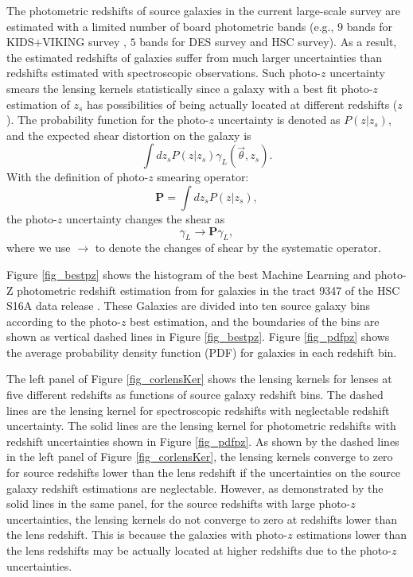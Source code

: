 \documentclass[twocolumn]{aastex62}
\begin{document}
The photometric redshifts of source galaxies in the current large-scale survey
are estimated with a limited number of board photometric bands (e.g., $9$ bands
for KIDS$+$VIKING survey \citep{KIDS_VIKING-Hildebrant2020}, $5$ bands for DES
survey and HSC survey). As a result, the estimated redshifts of galaxies suffer
from much larger uncertainties than redshifts estimated with spectroscopic
observations. Such photo-$z$ uncertainty smears the lensing kernels
statistically since a galaxy with a best fit photo-$z$ estimation of $z_s$ has
possibilities of being actually located at different redshifts ($z$).  The
probability function for the photo-$z$ uncertainty is denoted as $P(z|z_s)$,
and the expected shear distortion on the galaxy is
\begin{equation}\label{eq-delta2gamma-poz}
\int dz_s P(z|z_s) \gamma_L(\vec{\theta},z_s).
\end{equation}
With the definition of photo-$z$ smearing operator:
\begin{equation}
\mathbf{P} = \int dz_s P(z|z_s),
\end{equation}
the photo-$z$ uncertainty changes the shear as
\begin{equation}
\gamma_L \rightarrow \mathbf{P} \gamma_L,
\end{equation}
where we use $\rightarrow$ to denote the changes of shear by the systematic
operator.


Figure \ref{fig_bestpz} shows the histogram of the best Machine Learning and
photo-Z \citep[MLZ]{MLZ-TPZ2013} photometric redshift estimation from
\cite{HSC1-photoz} for galaxies in the tract 9347 of the HSC S16A data release
\citep{HSC1-data}. These Galaxies are divided into ten source galaxy bins
according to the photo-$z$ best estimation, and the boundaries of the bins are
shown as vertical dashed lines in Figure \ref{fig_bestpz}. Figure \ref{fig_pdfpz}
shows the average probability density function (PDF) for galaxies in each
redshift bin.

The left panel of Figure \ref{fig_corlensKer} shows the lensing kernels for
lenses at five different redshifts as functions of source galaxy redshift bins.
The dashed lines are the lensing kernel for spectroscopic redshifts with
neglectable redshift uncertainty. The solid lines are the lensing kernel for
photometric redshifts with redshift uncertainties shown in Figure
\ref{fig_pdfpz}.  As shown by the dashed lines in the left panel of Figure
\ref{fig_corlensKer}, the lensing kernels converge to zero for source redshifts
lower than the lens redshift if the uncertainties on the source galaxy
redshift estimations are neglectable. However, as demonstrated by the solid
lines in the same panel, for the source redshifts with large photo-$z$
uncertainties, the lensing kernels do not converge to zero at redshifts lower
than the lens redshift. This is because the galaxies with photo-$z$ estimations
lower than the lens redshifts may be actually located at higher redshifts due
to the photo-$z$ uncertainties.
\end{document}
